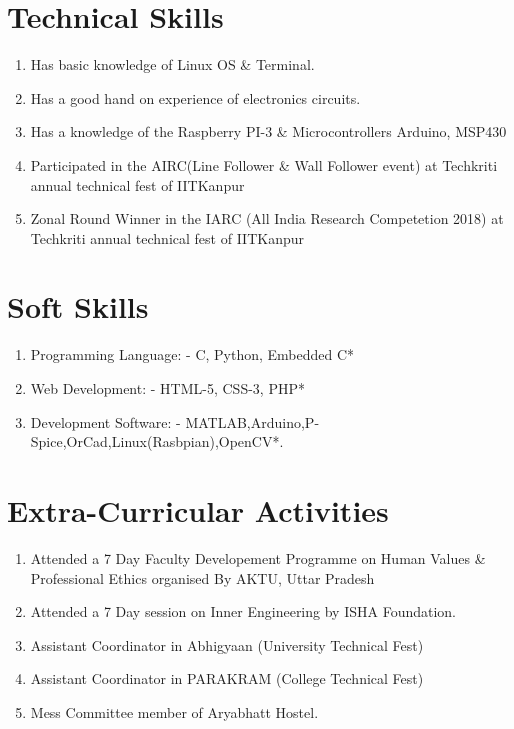 \documentclass[12pt]{article}
\begin{document}
\section*{Technical Skills}
\begin{enumerate}
  \item Has basic knowledge of Linux OS \& Terminal.
  \item Has a good hand on experience of electronics circuits.
  \item Has a knowledge of the Raspberry PI-3 \& Microcontrollers   Arduino, MSP430
  \item Participated in the AIRC(Line Follower \& Wall Follower event) at Techkriti annual technical fest of IITKanpur 
  \item Zonal Round Winner in the IARC (All India Research Competetion 2018) at Techkriti annual technical fest of IITKanpur 
\end{enumerate}


\section*{Soft Skills}
\begin{enumerate}

  \item Programming Language: - C, Python, Embedded C*
  \item Web Development: - HTML-5, CSS-3, PHP*
  \item Development Software: - MATLAB,Arduino,P-Spice,OrCad,Linux(Rasbpian),OpenCV*.
  \end{enumerate}
  
\section*{Extra-Curricular Activities}
\begin{enumerate}
\item Attended a 7 Day Faculty Developement Programme on Human Values \& Professional Ethics organised By
AKTU, Uttar Pradesh
\item Attended a 7 Day session on Inner Engineering by ISHA Foundation.
\item Assistant Coordinator in Abhigyaan (University Technical Fest)
\item Assistant Coordinator in PARAKRAM (College Technical Fest)
\item Mess Committee member of Aryabhatt Hostel.
\end{enumerate}
\end{document}
